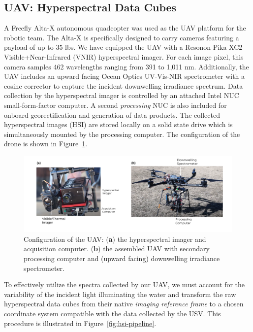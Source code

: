 \documentclass[journal,article,submit,pdftex,moreauthors]{Definitions/mdpi}
\begin{document}
\subsection{UAV: Hyperspectral Data Cubes}

A Freefly Alta-X autonomous quadcopter was used as the UAV platform for the robotic team. The Alta-X is specifically designed to carry cameras featuring a payload of up to 35 lbs. We have equipped the UAV with a Resonon Pika XC2 Visible+Near-Infrared (VNIR) hyperspectral imager. For each image pixel, this camera samples 462 wavelengths ranging from 391 to 1,011 nm.  Additionally, the UAV includes an upward facing Ocean Optics UV-Vis-NIR spectrometer with a cosine corrector to capture the incident downwelling irradiance spectrum. Data collection by the hyperspectral imager is controlled by an attached Intel NUC small-form-factor computer. A second \textit{processing} NUC is also included for onboard georectification and generation of data products. The collected hyperspectral images (HSI) are stored locally on a solid state drive which is simultaneously mounted by the processing computer. The configuration of the drone is shown in Figure~\ref{fig:drone-components}.

\begin{figure}[H]
\includegraphics[width=\columnwidth]{paper/figures/materials-and-methods/annotated-drone.pdf}
\caption{Configuration of the UAV: (\textbf{a}) the hyperspectral imager and acquisition computer. (\textbf{b}) the assembled UAV with secondary processing computer and (upward facing) downwelling irradiance spectrometer. \label{fig:drone-components}}
\end{figure} 

To effectively utilize the spectra collected by our UAV, we must account for the variability of the incident light illuminating the water and transform the raw hyperspectral data cubes from their native \textit{imaging reference frame} to a chosen coordinate system compatible with the data collected by the USV. This procedure is illustrated in Figure~\ref{fig:hsi-pipeline}.
\end{document}
